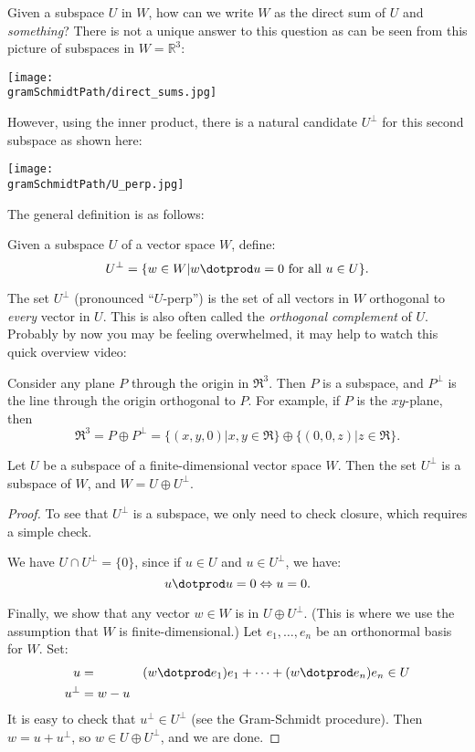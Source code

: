 Given a subspace $U$ in $W$, how can we write $W$ as the direct sum of $U$ and \emph{something}? There is not a unique answer to this question as can be seen from this picture of subspaces in $W={\mathbb R}^3$: 
\begin{center}
\texttt{[image: \\gramSchmidtPath/direct\_sums.jpg]}
\end{center}
However, using the inner product, there is a natural candidate $U^\perp$ for this second subspace as shown here:
\begin{center}
\texttt{[image: \\gramSchmidtPath/U\_perp.jpg]}
\end{center}

The general definition is as follows:
\begin{definition}
Given a subspace $U$ of a vector space $W$, define:
\[
U^\perp = \{w\in W | w\dotprod u=0 \text{ for all } u\in U\}.
\]
\end{definition}

The set $U^\perp$ (pronounced ``$U$-perp'') is the set of all vectors in $W$ orthogonal to \emph{every} vector in $U$.  This is also often called the \emph{orthogonal complement} of $U$. Probably by now you may be feeling overwhelmed, it may help to watch this quick overview video:




\begin{example}
Consider any plane $P$ through the origin in $\Re^3$.  Then $P$ is a subspace, and $P^\perp$ is the line through the origin orthogonal to $P$.  For example, if $P$ is the $xy$-plane, then
\[
\Re^3=P\oplus P^\perp=\{(x,y,0)| x,y\in \Re \} \oplus \{(0,0,z)| z\in \Re \}.
\]
\end{example}

\begin{theorem}
Let $U$ be a subspace of a finite-dimensional vector space $W$.  Then the set $U^\perp$ is a subspace of $W$, and $W=U\oplus U^\perp$.
\end{theorem}

\begin{proof}
To see that $U^\perp$ is a subspace, we only need to check closure, which requires a simple check.

We have $U\cap U^\perp=\{0\}$, since if $u\in U$ and $u\in U^\perp$, we have:
\[
u\dotprod u = 0 \Leftrightarrow u=0.
\]

Finally, we show that any vector $w\in W$ is in $U\oplus U^\perp$.  (This is where we use the assumption that $W$ is finite-dimensional.)  Let $e_1, \ldots, e_n$ be an orthonormal basis for $W$.  Set: 
\begin{align*}
u&=&(w\dotprod e_1)e_1 + \cdots + (w\dotprod e_n)e_n \in U\\
u^\perp&= w-u
\end{align*}
It is easy to check that $u^\perp \in U^\perp$ (see the Gram-Schmidt procedure).  Then $w=u+u^\perp$, so $w\in U\oplus U^\perp$, and we are done.
\end{proof}

